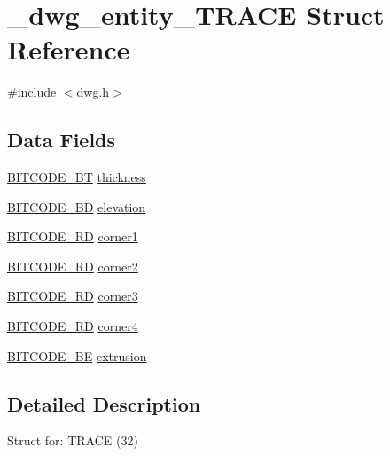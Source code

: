\hypertarget{struct__dwg__entity__TRACE}{\section{\-\_\-dwg\-\_\-entity\-\_\-\-T\-R\-A\-C\-E \-Struct \-Reference}
\label{struct__dwg__entity__TRACE}
}


{\ttfamily \#include $<$dwg.\-h$>$}

\subsection*{\-Data \-Fields}
\begin{DoxyCompactItemize}
\item 
\hyperlink{dwg_8h_afc93a5ddc38aeff965d4e93c71514495}{\-B\-I\-T\-C\-O\-D\-E\-\_\-\-B\-T} \hyperlink{struct__dwg__entity__TRACE_af0619e0e7396b19ce9bfc23ccd863c77}{thickness}
\item 
\hyperlink{dwg_8h_a3c1e6781466b74ba07785d57da70ed97}{\-B\-I\-T\-C\-O\-D\-E\-\_\-\-B\-D} \hyperlink{struct__dwg__entity__TRACE_ae30b5c8f7e1eb58ce77b45c567b9f5e2}{elevation}
\item 
\hyperlink{dwg_8h_a1d23a9bc9a02453876b244dc6706f6a6}{\-B\-I\-T\-C\-O\-D\-E\-\_\-R\-D} \hyperlink{struct__dwg__entity__TRACE_adf34a82234719b7b5c8a78f320fc6586}{corner1}
\item 
\hyperlink{dwg_8h_a1d23a9bc9a02453876b244dc6706f6a6}{\-B\-I\-T\-C\-O\-D\-E\-\_\-R\-D} \hyperlink{struct__dwg__entity__TRACE_a4f0f3a53e6995bf12865a961af591a04}{corner2}
\item 
\hyperlink{dwg_8h_a1d23a9bc9a02453876b244dc6706f6a6}{\-B\-I\-T\-C\-O\-D\-E\-\_\-R\-D} \hyperlink{struct__dwg__entity__TRACE_abc56866ee8b25d2fc300aaf71ab84366}{corner3}
\item 
\hyperlink{dwg_8h_a1d23a9bc9a02453876b244dc6706f6a6}{\-B\-I\-T\-C\-O\-D\-E\-\_\-R\-D} \hyperlink{struct__dwg__entity__TRACE_a0bf322465fb01c12452f3dbba68070a2}{corner4}
\item 
\hyperlink{dwg_8h_ac2622137c01aa3a719ec6c571d06ee6a}{\-B\-I\-T\-C\-O\-D\-E\-\_\-\-B\-E} \hyperlink{struct__dwg__entity__TRACE_a509575be9fb4938790f53d6888273231}{extrusion}
\end{DoxyCompactItemize}


\subsection{\-Detailed \-Description}
\-Struct for\-: \-T\-R\-A\-C\-E (32) 

